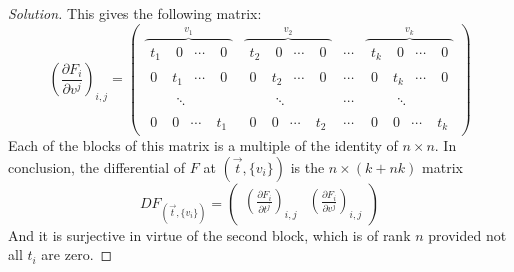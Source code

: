 \begin{proof}[Solution]
This gives the following matrix:
\[\left(\frac{\partial F_i}{\partial v^j}\right)_{i,j} =\begin{pmatrix}\overbrace{\begin{aligned}t_1 &\; 0 & \cdots  &\; 0\end{aligned}}^{v_1} &  \overbrace{\begin{aligned}t_2 &\; 0 & \cdots  &\; 0\end{aligned}}^{v_2} &  \cdots  &  \overbrace{\begin{aligned}t_k &\; 0 & \cdots  &\; 0\end{aligned}}^{v_k}\\
\begin{aligned}0 &\; t_1 & \cdots  &\; 0\end{aligned}& \begin{aligned}0 &\; t_2 & \cdots  &\; 0\end{aligned}& \cdots & \begin{aligned}0 &\; t_k & \cdots  &\; 0\end{aligned}\\
\begin{aligned} &\;  & \ddots  &\; \end{aligned}& \begin{aligned} &\;  & \ddots  &\; \end{aligned}& \cdots & \begin{aligned} &\;  & \ddots  &\; \end{aligned}\\
\begin{aligned}0 &\; 0 & \cdots  &\; t_1\end{aligned}& \begin{aligned}0 &\; 0 & \cdots  &\; t_2\end{aligned}& \cdots & \begin{aligned}0 &\; 0 & \cdots  &\; t_k\end{aligned}
\end{pmatrix}\]
Each of the blocks of this matrix is a multiple of the identity of \(n \times n\). In conclusion, the differential of \(F\) at \((\vec{t},\{v_i\})\) is the \(n \times (k+nk)\) matrix
\[DF_{(\vec{t},\{v_i\})}=\begin{pmatrix} \left(\frac{\partial F_i}{\partial t^j}\right)_{i,j} &\left(\frac{\partial F_i}{\partial v^j}\right)_{i,j}  \end{pmatrix} \]
And it is surjective in virtue of the second block, which is of rank \(n\) provided not all \(t_i\) are zero.
\end{proof}





